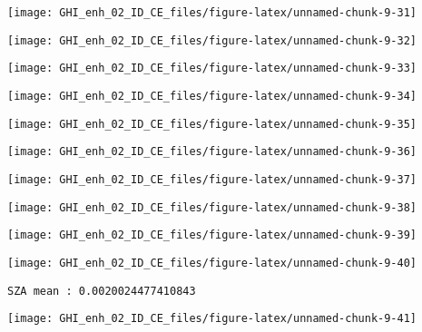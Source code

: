 \documentclass[
  10pt,
  a4paper,oneside]{article}
\begin{document}
\begin{center}\texttt{[image: GHI\_enh\_02\_ID\_CE\_files/figure-latex/unnamed-chunk-9-31]} \end{center}

\begin{center}\texttt{[image: GHI\_enh\_02\_ID\_CE\_files/figure-latex/unnamed-chunk-9-32]} \end{center}

\begin{center}\texttt{[image: GHI\_enh\_02\_ID\_CE\_files/figure-latex/unnamed-chunk-9-33]} \end{center}

\begin{center}\texttt{[image: GHI\_enh\_02\_ID\_CE\_files/figure-latex/unnamed-chunk-9-34]} \end{center}

\begin{center}\texttt{[image: GHI\_enh\_02\_ID\_CE\_files/figure-latex/unnamed-chunk-9-35]} \end{center}

\begin{center}\texttt{[image: GHI\_enh\_02\_ID\_CE\_files/figure-latex/unnamed-chunk-9-36]} \end{center}

\begin{center}\texttt{[image: GHI\_enh\_02\_ID\_CE\_files/figure-latex/unnamed-chunk-9-37]} \end{center}

\begin{center}\texttt{[image: GHI\_enh\_02\_ID\_CE\_files/figure-latex/unnamed-chunk-9-38]} \end{center}

\begin{center}\texttt{[image: GHI\_enh\_02\_ID\_CE\_files/figure-latex/unnamed-chunk-9-39]} \end{center}

\begin{center}\texttt{[image: GHI\_enh\_02\_ID\_CE\_files/figure-latex/unnamed-chunk-9-40]} \end{center}

\begin{verbatim}
SZA mean : 0.0020024477410843 
\end{verbatim}

\begin{center}\texttt{[image: GHI\_enh\_02\_ID\_CE\_files/figure-latex/unnamed-chunk-9-41]} \end{center}
\end{document}
